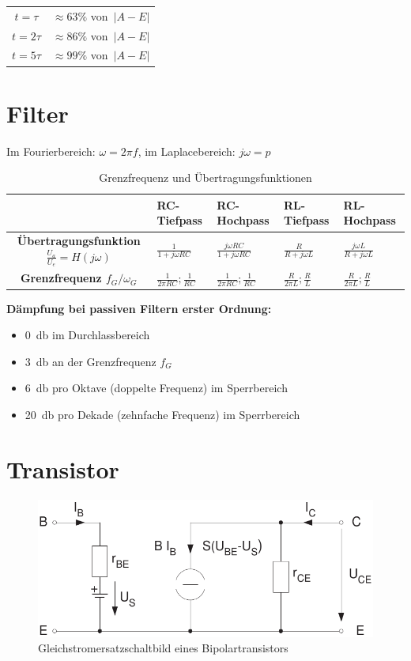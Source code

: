 \documentclass[a5paper, 12pt]{scrartcl}
\begin{document}

\begin{table}
  \centering
  \begin{tabular}{cc}
    \toprule
    \(t=\tau\) & \(\approx 63\%\) von\ \(|A-E|\)\\
    \(t=2\tau\) & \(\approx 86\%\) von\ \(|A-E|\)\\
    \(t=5\tau\) & \(\approx 99\%\) von\ \(|A-E|\)\\
    \bottomrule
  \end{tabular}
\end{table}

\section{Filter}

Im Fourierbereich: \(\omega = 2 \pi f\), im Laplacebereich: \(j\omega = p\)

\begin{table}[H]
  \centering
  \begin{tabular}{cllll}
    \toprule
    & \textbf{RC-Tiefpass} & \textbf{RC-Hochpass} & \textbf{RL-Tiefpass} & \textbf{RL-Hochpass}\\
    \midrule
    \textbf{Übertragungsfunktion \(\frac{U_a}{U_e} = H(j\omega)\)} & \(\frac{1}{1 + j\omega R C}\) & \(\frac{j\omega RC}{1 + j\omega RC}\) & \(\frac{R}{R + j \omega L}\)& \(\frac{j\omega L}{R + j \omega L}\) \\[1em]
    \textbf{Grenzfrequenz \(f_G / \omega_G\)} & \(\frac{1}{2 \pi R C}; \frac{1}{RC}\) & \(\frac{1}{2 \pi R C}; \frac{1}{RC}\) & \(\frac{R}{2 \pi L}; \frac{R}{L}\) & \(\frac{R}{2 \pi L}; \frac{R}{L}\)\\
    \bottomrule
  \end{tabular}
  \caption{Grenzfrequenz und Übertragungsfunktionen}
\end{table}

\textbf{Dämpfung bei passiven Filtern erster Ordnung:}

\begin{itemize}
\item \SI{0}{\decibel} im Durchlassbereich
\item \SI{3}{\decibel} an der Grenzfrequenz \(f_G\)
\item \SI{6}{\decibel} pro Oktave (doppelte Frequenz) im Sperrbereich
\item \SI{20}{\decibel} pro Dekade (zehnfache Frequenz) im Sperrbereich
\end{itemize}

\section{Transistor}

\begin{figure}[H]
  \centering
  \includegraphics[width=.6\textwidth]{ESBTransistor}
  \caption{Gleichstromersatzschaltbild eines Bipolartransistors}
\end{figure}
\end{document}
